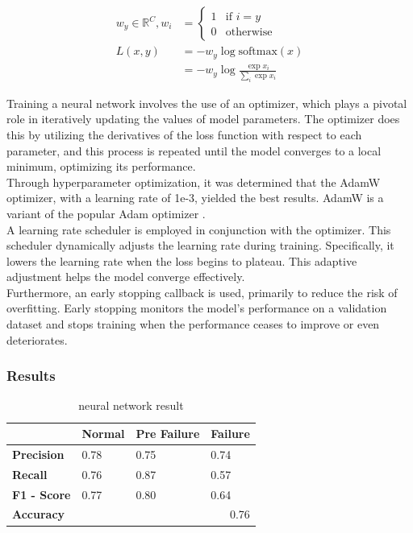 \documentclass{article}
\begin{document}
\begin{align}
    w_y \in \mathbb{R}^C, w_i &= \begin{cases}
    1 & \text{if } i = y\\
    0 & \text{otherwise}
\end{cases} \\
    L(x,y) &= -w_y\log{\text{softmax}(x)} \\
    &= -w_y\log{\frac{\exp{x_i}}{\sum_i{\exp x_i}}}
\end{align}

Training a neural network involves the use of an optimizer, which plays a pivotal role in iteratively updating the values of model parameters. The optimizer does this by utilizing the derivatives of the loss function with respect to each parameter, and this process is repeated until the model converges to a local minimum, optimizing its performance.\\

Through hyperparameter optimization, it was determined that the AdamW optimizer, with a learning rate of 1e-3, yielded the best results. AdamW is a variant of the popular Adam optimizer \cite{loshchilov2019}.\\

A learning rate scheduler is employed in conjunction with the optimizer. This scheduler dynamically adjusts the learning rate during training. Specifically, it lowers the learning rate when the loss begins to plateau. This adaptive adjustment helps the model converge effectively.\\

Furthermore, an early stopping callback is used, primarily to reduce the risk of overfitting. Early stopping monitors the model's performance on a validation dataset and stops training when the performance ceases to improve or even deteriorates.

\subsubsection{Results}

\begin{table}[hbpt]
\caption{neural network result}
\centering
\begin{tabular}{|l|lll|}
\hline
                    & \multicolumn{1}{l|}{\textbf{Normal}} & \multicolumn{1}{l|}{\textbf{Pre Failure}} & \textbf{Failure} \\ \hline
\textbf{Precision}  & \multicolumn{1}{l|}{0.78}            & \multicolumn{1}{l|}{0.75}                 & 0.74             \\ \hline
\textbf{Recall}     & \multicolumn{1}{l|}{0.76}            & \multicolumn{1}{l|}{0.87}                 & 0.57             \\ \hline
\textbf{F1 - Score} & \multicolumn{1}{l|}{0.77}            & \multicolumn{1}{l|}{0.80}                 & 0.64             \\ \hline
\textbf{Accuracy}   & \multicolumn{3}{r|}{0.76}                                                                           \\ \hline
\end{tabular}
\end{table}
\end{document}
